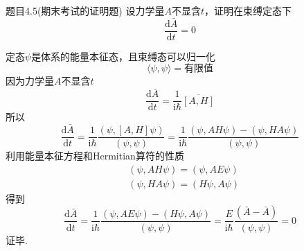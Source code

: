 \begin{question}{题目4.5(期末考试的证明题)}
    设力学量$A$不显含$t$，证明在束缚定态下
    $$
        \frac{\mathrm{d}\bar{A}}{\mathrm{d}t} = 0
    $$
\end{question}
\begin{solution}
    定态$\psi$是体系的能量本征态，且束缚态可以归一化
    $$
        \langle\psi, \psi\rangle = \text{有限值}
    $$
    因为力学量$A$不显含$t$
    $$
        \frac{\mathrm{d}\bar{A}}{\mathrm{d}t}=\frac{1}{\mathrm{i}\hbar}\overline{[A, H]}
    $$
    所以
    $$
        \frac{\mathrm{d}\bar{A}}{\mathrm{d}t}
        =\frac{1}{\mathrm{i}\hbar}\frac{(\psi, [A,H]\psi)}{(\psi, \psi)}
        =\frac{1}{\mathrm{i}\hbar}\frac{(\psi, AH\psi)-(\psi, HA\psi)}{(\psi, \psi)}
    $$
    利用能量本征方程和Hermitian算符的性质
    $$
        \begin{aligned}
             & (\psi, AH\psi) = (\psi, AE\psi) \\
             & (\psi, HA\psi) = (H\psi, A\psi)
        \end{aligned}
    $$
    得到
    $$
        \frac{\mathrm{d}\bar{A}}{\mathrm{d}t}
        =\frac{1}{\mathrm{i}\hbar}\frac{(\psi, AE\psi)-(H\psi, A\psi)}{(\psi, \psi)}
        =\frac{E}{\mathrm{i}\hbar}\frac{(\bar{A}-\bar{A})}{(\psi, \psi)}
        =0
    $$
    证毕.
\end{solution}





